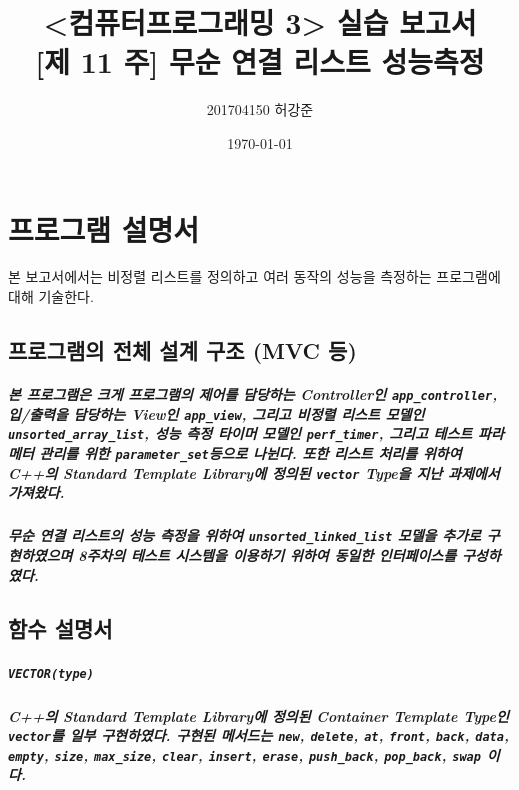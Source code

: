\documentclass[UTF8, a4paper]{report}
\title{%
    <컴퓨터프로그래밍 3> 실습 보고서 \\ 
    \large [제 11 주] 무순 연결 리스트 성능측정}
\author{201704150 허강준}
\date{\today}
\begin{document}
    \maketitle
    \tableofcontents

    \chapter{프로그램 설명서}
        본 보고서에서는 비정렬 리스트를 정의하고 여러 동작의 성능을 측정하는 프로그램에 대해 기술한다.

        \section{프로그램의 전체 설계 구조 (MVC 등)}
            
            \paragraph{%
                \normalfont 본 프로그램은 크게 프로그램의 제어를 담당하는 Controller인 \texttt{app\_controller}, 입/출력을 담당하는 View인 \texttt{app\_view}, 그리고 비정렬 리스트 모델인 \texttt{unsorted\_array\_list}, 성능 측정 타이머 모델인 \texttt{perf\_timer}, 그리고 테스트 파라메터 관리를 위한 \texttt{parameter\_set}등으로 나뉜다. 또한 리스트 처리를 위하여 C++의 Standard Template Library에 정의된 \texttt{vector} Type을 지난 과제에서 가져왔다.
            }

            \paragraph{%
                \normalfont 무순 연결 리스트의 성능 측정을 위하여 \texttt{unsorted\_linked\_list} 모델을 추가로 구현하였으며 8주차의 테스트 시스템을 이용하기 위하여 동일한 인터페이스를 구성하였다.
            }
            
        \section{함수 설명서}
            
            \paragraph{\texttt{VECTOR(type)}}
            \paragraph{%
                \normalfont C++의 Standard Template Library에 정의된 Container Template Type인 \texttt{vector}를 일부 구현하였다. 구현된 메서드는 \texttt{new},  \texttt{delete}, \texttt{at}, \texttt{front}, \texttt{back}, \texttt{data}, \texttt{empty}, \texttt{size}, \texttt{max\_size}, \texttt{clear}, \texttt{insert}, \texttt{erase}, \texttt{push\_back}, \texttt{pop\_back}, \texttt{swap} 이다.
            }
\end{document}
